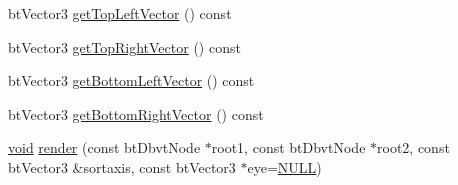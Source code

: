 \begin{DoxyCompactItemize}
\item 
bt\+Vector3 \mbox{\hyperlink{classnjli_1_1_camera_a39c4a0125df6b0d97cb43e381fd34a7b}{get\+Top\+Left\+Vector}} () const
\item 
bt\+Vector3 \mbox{\hyperlink{classnjli_1_1_camera_a6850bfa65f9550c019376e27adf711b1}{get\+Top\+Right\+Vector}} () const
\item 
bt\+Vector3 \mbox{\hyperlink{classnjli_1_1_camera_a08f8920fe8982d3c734298ef6f119c75}{get\+Bottom\+Left\+Vector}} () const
\item 
bt\+Vector3 \mbox{\hyperlink{classnjli_1_1_camera_a86191e9e3772abe7bb18294d57ed77a7}{get\+Bottom\+Right\+Vector}} () const
\item 
\mbox{\hyperlink{_thread_8h_af1e856da2e658414cb2456cb6f7ebc66}{void}} \mbox{\hyperlink{classnjli_1_1_camera_a4ce0a661f8a18d87af3453d8159793ed}{render}} (const bt\+Dbvt\+Node $\ast$root1, const bt\+Dbvt\+Node $\ast$root2, const bt\+Vector3 \&sortaxis, const bt\+Vector3 $\ast$eye=\mbox{\hyperlink{_util_8h_a070d2ce7b6bb7e5c05602aa8c308d0c4}{N\+U\+LL}})
\end{DoxyCompactItemize}
